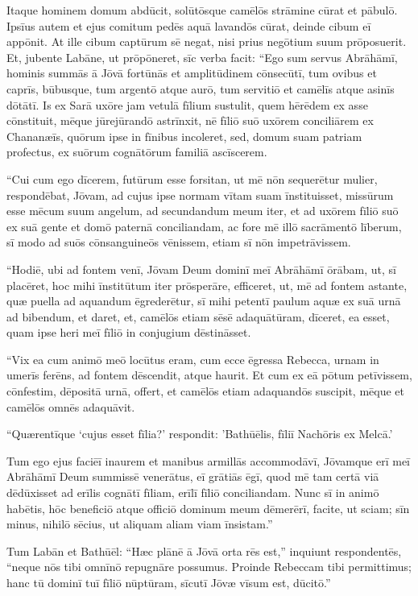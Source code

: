 \Versus Itaque hominem domum abdūcit, solūtōsque camēlōs strāmine cūrat et pābulō. Ipsīus autem et ejus comitum pedēs aquā lavandōs cūrat,
\Versus deinde cibum eī appōnit. At ille cibum captūrum sē negat, nisi prius negōtium suum prōposuerit. Et, jubente Labāne, ut prōpōneret,
\Versus sīc verba facit: ``Ego sum servus Abrāhāmī,
\Versus hominis summās ā Jōvā fortūnās et amplitūdinem cōnsecūtī, tum ovibus et caprīs, būbusque, tum argentō atque aurō, tum servitiō et camēlīs atque asinīs dōtātī.
\Versus Is ex Sarā uxōre jam vetulā fīlium sustulit, quem hērēdem ex asse cōnstituit,
\Versus mēque jūrejūrandō astrīnxit, nē fīliō suō uxōrem conciliārem ex Chananæīs, quōrum ipse in fīnibus incoleret,
\Versus sed, domum suam patriam profectus, ex suōrum cognātōrum familiā ascīscerem.

\Versus ``Cui cum ego dīcerem, futūrum esse forsitan, ut mē nōn sequerētur mulier,
\Versus respondēbat, Jōvam, ad cujus ipse normam vītam suam īnstituisset, missūrum esse mēcum suum angelum, ad secundandum meum iter, et ad uxōrem fīliō suō ex suā gente et domō paternā conciliandam,
\Versus ac fore mē illō sacrāmentō līberum, sī modo ad suōs cōnsanguineōs vēnissem, etiam sī nōn impetrāvissem.

\Versus ``Hodiē, ubi ad fontem venī, Jōvam Deum dominī meī Abrāhāmī ōrābam, ut, sī placēret, hoc mihi īnstitūtum iter prōsperāre, efficeret,
\Versus ut, mē ad fontem astante, quæ puella ad aquandum ēgrederētur, sī mihi petentī paulum aquæ ex suā urnā ad bibendum,
\Versus et daret, et, camēlōs etiam sēsē adaquātūram, dīceret, ea esset, quam ipse heri meī fīliō in conjugium dēstināsset.

\Versus ``Vix ea cum animō meō locūtus eram, cum ecce ēgressa Rebecca, urnam in umerīs ferēns, ad fontem dēscendit, atque haurit. Et cum ex eā pōtum petīvissem,
\Versus cōnfestim, dēpositā urnā, offert, et camēlōs etiam adaquandōs suscipit, mēque et camēlōs omnēs adaquāvit.

\Versus ``Quærentīque `cujus esset fīlia?' respondit: 'Bathūēlis, fīliī Nachōris ex Melcā.'

Tum ego ejus faciēī inaurem et manibus armillās accommodāvī,
\Versus Jōvamque erī meī Abrāhāmī Deum summissē venerātus, eī grātiās ēgī, quod mē tam certā viā dēdūxisset ad erīlis cognātī fīliam, erīlī fīliō conciliandam.
\Versus Nunc sī in animō habētis, hōc beneficiō atque officiō dominum meum dēmerērī, facite, ut sciam; sīn minus, nihilō sēcius, ut aliquam aliam viam īnsistam.''

\Versus Tum Labān et Bathūēl: ``Hæc plānē ā Jōvā orta rēs est,'' inquiunt respondentēs, ``neque nōs tibi omnīnō repugnāre possumus.
\Versus Proinde Rebeccam tibi permittimus; hanc tū dominī tuī fīliō nūptūram, sīcutī Jōvæ vīsum est, dūcitō.''

